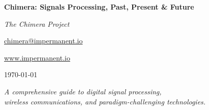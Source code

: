 \begin{titlepage}
    \centering
    \vspace*{2cm}
    
    {\Huge\bfseries\color{NavyBlue} Chimera: Signals Processing, Past, Present \& Future\par}
    \vspace{1cm}
    {\Large\itshape The Chimera Project\par}
    \vspace{0.2cm}
    {\small\href{mailto:chimera@impermanent.io}{chimera@impermanent.io}\par}
    {\small\url{www.impermanent.io}\par}
    \vspace{0.5cm}
    {\large \today\par}
    
    \vspace{2cm}
    
    {\large\itshape
    A comprehensive guide to digital signal processing,\\
    wireless communications, and paradigm-challenging technologies.\par}
    
    \vfill
    
\end{titlepage}
